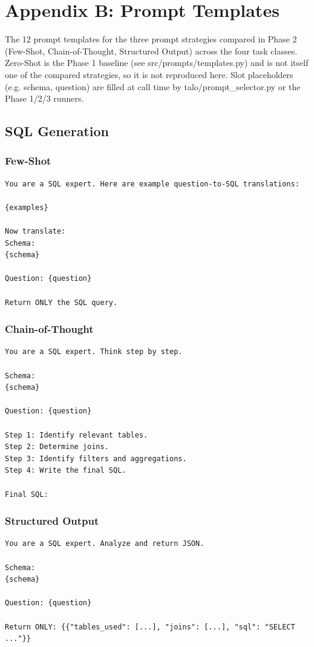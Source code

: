 \section{Appendix B: Prompt Templates}

The 12 prompt templates for the three prompt strategies compared in Phase 2 (Few-Shot, Chain-of-Thought, Structured Output) across the four task classes. Zero-Shot is the Phase 1 baseline (see src/prompts/templates.py) and is not itself one of the compared strategies, so it is not reproduced here. Slot placeholders (e.g. {schema}, {question}) are filled at call time by talo/prompt_selector.py or the Phase 1/2/3 runners.

\subsection{SQL Generation}
\subsubsection{Few-Shot}
\begin{verbatim}
You are a SQL expert. Here are example question-to-SQL translations:

{examples}

Now translate:
Schema:
{schema}

Question: {question}

Return ONLY the SQL query.
\end{verbatim}

\subsubsection{Chain-of-Thought}
\begin{verbatim}
You are a SQL expert. Think step by step.

Schema:
{schema}

Question: {question}

Step 1: Identify relevant tables.
Step 2: Determine joins.
Step 3: Identify filters and aggregations.
Step 4: Write the final SQL.

Final SQL:
\end{verbatim}

\subsubsection{Structured Output}
\begin{verbatim}
You are a SQL expert. Analyze and return JSON.

Schema:
{schema}

Question: {question}

Return ONLY: {{"tables_used": [...], "joins": [...], "sql": "SELECT ..."}}
\end{verbatim}

